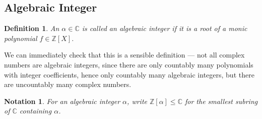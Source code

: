 \documentclass{article}
\theoremstyle{plain}\theoremheaderfont{\normalfont\itshape}\theorembodyfont{\rmfamily}\theoremseparator{.}\newtheorem*{rem}{Remark}\newtheorem*{ex}{Example}\newtheorem*{proof}{Proof}\newtheorem*{altp}{Alternative proof}\newtheorem*{nonex}{Non-Example}
\theoremstyle{plain}\theoremheaderfont{\normalfont\bfseries}\theorembodyfont{\rmfamily}\theoremseparator{.}\newtheorem{thm}{Theorem}[section]\newtheorem{lem}[thm]{Lemma}\newtheorem{prop}[thm]{Proposition}\newtheorem*{cor}{Corollary}\newtheorem{defn}[thm]{Definition}\newtheorem{clm}[thm]{Claim}\newtheorem{clminproof}{Claim}\newtheorem*{notn}{Notation}\newtheorem*{exer}{Exercise}\newtheorem*{lemnn}{Lemma}
\theoremstyle{break}\theoremheaderfont{\normalfont\itshape}\theorembodyfont{\rmfamily}\theoremseparator{.\medskip}\newtheorem*{proofskip}{Proof}\newtheorem*{exs}{Examples}\newtheorem*{rems}{Remarks}\newtheorem*{obs}{Observations}
\theoremstyle{break}\theoremheaderfont{\normalfont\bfseries}\theorembodyfont{\rmfamily}\theoremseparator{.\medskip}\newtheorem{lemskip}[thm]{Lemma}\newtheorem{defnskip}[thm]{Definition}\newtheorem{propskip}[thm]{Proposition}\newtheorem{thmskip}[thm]{Theorem}
\numberwithin{equation}{section}
\newcommand{\ZZ}{\mathbb{Z}}
\newcommand{\CC}{\mathbb{C}}
\begin{document}
    \subsection{Algebraic Integer}
    \begin{defn}
        An \(\alpha\in\CC\) is called an \textit{algebraic integer} if it is a root of a monic polynomial \(f\in\ZZ[X]\).
    \end{defn}
    We can immediately check that this is a sensible definition --- not all complex numbers are algebraic integers, since there are only countably many polynomials with integer coefficients, hence only countably many algebraic integers, but there are uncountably many complex numbers.

    \begin{notn}
        For an algebraic integer \(\alpha\), write \(\ZZ[\alpha]\le\CC\) for the smallest subring of \(\CC\) containing \(\alpha\).
    \end{notn}
\end{document}
